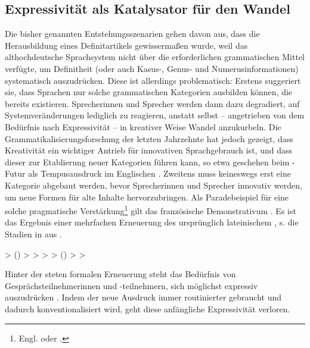 \subsection{Expressivität als Katalysator für den Wandel} \label{sec:kata}

Die bisher genannten Entstehungsszenarien gehen davon aus, dass die Herausbildung eines Definitartikels gewissermaßen  wurde, weil das althochdeutsche Sprachsystem nicht über die erforderlichen grammatischen Mittel verfügte, um Definitheit (oder auch Kasus-, Genus- und Numerusinformationen) systematisch auszudrücken. Diese  ist allerdings problematisch: Erstens suggeriert sie, dass Sprachen nur solche grammatischen Kategorien ausbilden können, die bereits existieren. Sprecherinnen und Sprecher werden dann dazu degradiert, auf Systemveränderungen lediglich zu reagieren, anstatt selbst -- angetrieben von dem Bedürfnis nach Expressivität -- in kreativer Weise Wandel anzukurbeln. Die Grammatikalisierungsforschung der letzten Jahrzehnte hat jedoch gezeigt, dass Kreativität ein wichtiger Antrieb für innovativen Sprachgebrauch ist, und dass dieser zur Etablierung neuer Kategorien führen kann, so etwa geschehen beim -Futur als Tempusausdruck im Englischen \parencite[s. z.B.][30ff]{Heine1991}. Zweitens muss keineswegs erst eine Kategorie abgebaut werden, bevor Sprecherinnen und Sprecher innovativ werden, um neue Formen für alte Inhalte hervorzubringen. Als Paradebeispiel für eine solche pragmatische Verstärkung\footnote{Engl.  oder  \parencite[s.][94]{Hopper2006}.} gilt das französische Demonstrativum . Es ist das Ergebnis einer mehrfachen Erneuerung des ursprünglich lateinischem , s. die Stadien in  aus \textcite[94]{Hopper2006}. 

\begin{exe}
	\ex \label{ex:ca}   > ()    >  >  >  > ()  >  > 
\end{exe}

Hinter der steten formalen Erneuerung steht das Bedürfnis von Gesprächsteilnehmerinnen und -teilnehmern, sich möglichst expressiv auszudrücken \parencites[179]{Detges2002}[73]{Hopper2006}[176]{Lehmann2015}. Indem der neue Ausdruck immer routinierter gebraucht und dadurch konventionalisiert wird, geht diese anfängliche Expressivität verloren. 

